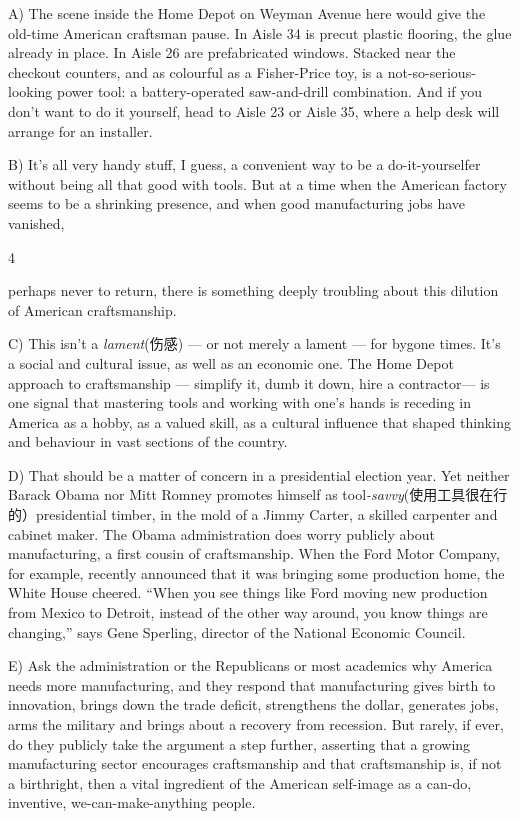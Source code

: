 \documentclass[UTF8,11pt]{ctexart}
\begin{document}
A) The scene inside the Home Depot on Weyman Avenue here would give the old-time American craftsman pause. In Aisle 34 is precut plastic flooring, the glue already in place. In Aisle 26 are prefabricated windows. Stacked near the checkout counters, and as colourful as a Fisher-Price toy, is a not-so-serious-looking power tool: a battery-operated saw-and-drill combination. And if you don’t want to do it yourself, head to Aisle 23 or Aisle 35, where a help desk will arrange for an installer.


B) It’s all very handy stuff, I guess, a convenient way to be a do-it-yourselfer without being all that good with tools. But at a time when the American factory seems to be a shrinking presence, and when good manufacturing jobs have vanished,


4


perhaps never to return, there is something deeply troubling about this dilution of American craftsmanship.


C) This isn’t a\textit{ lament}(伤感) — or not merely a lament — for bygone times. It’s a social and cultural issue, as well as an economic one. The Home Depot approach to craftsmanship — simplify it, dumb it down, hire a contractor— is one signal that mastering tools and working with one’s hands is receding in America as a hobby, as a valued skill, as a cultural influence that shaped thinking and behaviour in vast sections of the country.


D) That should be a matter of concern in a presidential election year. Yet neither Barack Obama nor Mitt Romney promotes himself as tool\textit{-savvy}(使用工具很在行的）presidential timber, in the mold of a Jimmy Carter, a skilled carpenter and cabinet maker. The Obama administration does worry publicly about manufacturing, a first cousin of craftsmanship. When the Ford Motor Company, for example, recently announced that it was bringing some production home, the White House cheered. “When you see things like Ford moving new production from Mexico to Detroit, instead of the other way around, you know things are changing,” says Gene Sperling, director of the National Economic Council.


E) Ask the administration or the Republicans or most academics why America needs more manufacturing, and they respond that manufacturing gives birth to innovation, brings down the trade deficit, strengthens the dollar, generates jobs, arms the military and brings about a recovery from recession. But rarely, if ever, do they publicly take the argument a step further, asserting that a growing manufacturing sector encourages craftsmanship and that craftsmanship is, if not a birthright, then a vital ingredient of the American self-image as a can-do, inventive, we-can-make-anything people.
\end{document}
